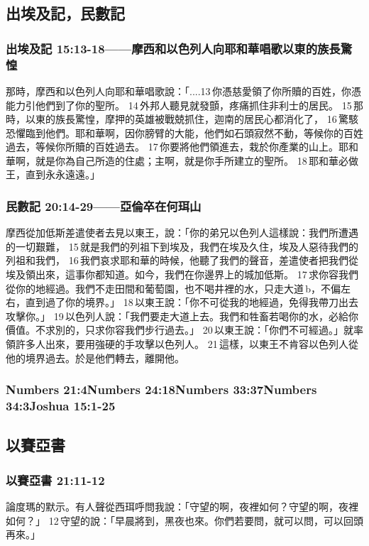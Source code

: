 \subsection{出埃及記，民數記 }
\subsubsection{出埃及記 15:13-18——摩西和以色列人向耶和華唱歌以東的族長驚惶}
那時，摩西和以色列人向耶和華唱歌說：「....13 你憑慈愛領了你所贖的百姓，你憑能力引他們到了你的聖所。 14 外邦人聽見就發顫，疼痛抓住非利士的居民。 15 那時，以東的族長驚惶，摩押的英雄被戰兢抓住，迦南的居民心都消化了， 16 驚駭恐懼臨到他們。耶和華啊，因你膀臂的大能，他們如石頭寂然不動，等候你的百姓過去，等候你所贖的百姓過去。 17 你要將他們領進去，栽於你產業的山上。耶和華啊，就是你為自己所造的住處；主啊，就是你手所建立的聖所。 18 耶和華必做王，直到永永遠遠。」

\subsubsection{民數記 20:14-29——亞倫卒在何珥山}
摩西從加低斯差遣使者去見以東王，說：「你的弟兄以色列人這樣說：我們所遭遇的一切艱難， 15 就是我們的列祖下到埃及，我們在埃及久住，埃及人惡待我們的列祖和我們， 16 我們哀求耶和華的時候，他聽了我們的聲音，差遣使者把我們從埃及領出來，這事你都知道。如今，我們在你邊界上的城加低斯。 17 求你容我們從你的地經過。我們不走田間和葡萄園，也不喝井裡的水，只走大道 b，不偏左右，直到過了你的境界。」 18 以東王說：「你不可從我的地經過，免得我帶刀出去攻擊你。」 19 以色列人說：「我們要走大道上去。我們和牲畜若喝你的水，必給你價值。不求別的，只求你容我們步行過去。」 20 以東王說：「你們不可經過。」就率領許多人出來，要用強硬的手攻擊以色列人。 21 這樣，以東王不肯容以色列人從他的境界過去。於是他們轉去，離開他。
\subsubsection{Numbers 21:4Numbers 24:18Numbers 33:37Numbers 34:3Joshua 15:1-25}

\subsection{以賽亞書}
\subsubsection{以賽亞書  21:11-12}
論度瑪的默示。有人聲從西珥呼問我說：「守望的啊，夜裡如何？守望的啊，夜裡如何？」 12 守望的說：「早晨將到，黑夜也來。你們若要問，就可以問，可以回頭再來。」

